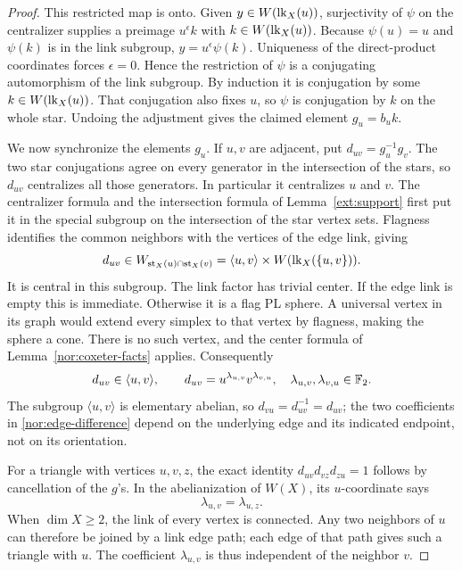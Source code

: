 \begin{proof}
This restricted map is onto.  Given $y\in W(\operatorname{lk}_X(u))$,
surjectivity of $\psi$ on the centralizer supplies a preimage
$u^\epsilon k$ with $k\in W(\operatorname{lk}_X(u))$.  Because $\psi(u)=u$
and $\psi(k)$ is in the link subgroup,
$y=u^\epsilon\psi(k)$.  Uniqueness of the direct-product
coordinates forces $\epsilon=0$.  Hence the restriction of
$\psi$ is a conjugating automorphism of the link subgroup.
By induction it is conjugation by some $k\in W(\operatorname{lk}_X(u))$.
That conjugation also fixes $u$, so $\psi$ is conjugation by
$k$ on the whole star.  Undoing the adjustment gives the
claimed element $g_u=b_uk$.

We now synchronize the elements $g_u$.  If $u,v$ are
adjacent, put $d_{uv}=g_u^{-1}g_v$.  The two star
conjugations agree on every generator in the intersection of
the stars, so $d_{uv}$ centralizes all those generators.
In particular it centralizes $u$ and $v$.  The centralizer
formula and the intersection formula of
Lemma~\ref{ext:support} first put it in the special subgroup
on the intersection of the star vertex sets.  Flagness
identifies the common neighbors with the vertices of the
edge link, giving
\[
 d_{uv}\in W_{\operatorname{st}_X(u)\cap\operatorname{st}_X(v)}
   =\langle u,v\rangle\times W(\operatorname{lk}_X(\{u,v\})).
\]
It is central in this subgroup.  The link factor has trivial
center.  If the edge link is empty this is immediate.
Otherwise it is a flag PL sphere.  A universal vertex in its
graph would extend every simplex to that vertex by flagness,
making the sphere a cone.  There is no such vertex, and the
center formula of Lemma~\ref{nor:coxeter-facts} applies.
Consequently
\begin{equation}\label{nor:edge-difference}
 d_{uv}\in\langle u,v\rangle,\qquad
 d_{uv}=u^{\lambda_{u,v}}v^{\lambda_{v,u}},
 \quad \lambda_{u,v},\lambda_{v,u}\in\mathbb F_2.
\end{equation}
The subgroup $\langle u,v\rangle$ is elementary abelian, so
$d_{vu}=d_{uv}^{-1}=d_{uv}$; the two coefficients in
\eqref{nor:edge-difference} depend on the underlying edge
and its indicated endpoint, not on its orientation.

For a triangle with vertices $u,v,z$, the exact identity
$d_{uv}d_{vz}d_{zu}=1$ follows by cancellation of the
$g$'s.  In the abelianization of $W(X)$, its $u$-coordinate
says
\[
 \lambda_{u,v}=\lambda_{u,z}.
\]
When $\dim X\geq2$, the link of every vertex is connected.
Any two neighbors of $u$ can therefore be joined by a link
edge path; each edge of that path gives such a triangle with
$u$.  The coefficient $\lambda_{u,v}$ is thus independent
of the neighbor $v$.


\end{proof}

